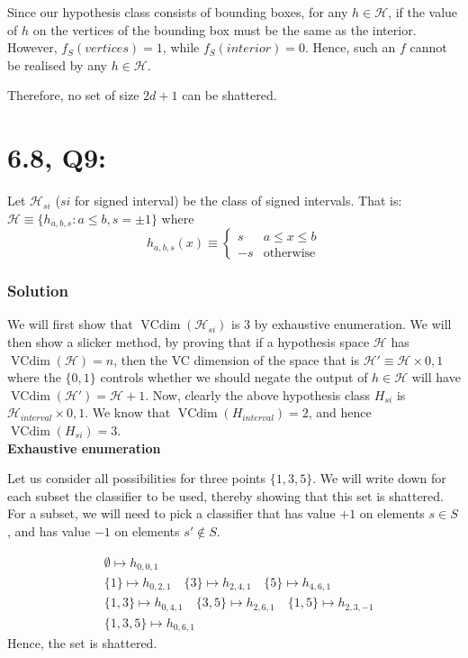 \documentclass[11pt]{article}
\renewcommand{\H}{\ensuremath{\mathcal{H}}}
\DeclareMathOperator{\vcdim}{VCdim}
\newcommand{\vc}{\ensuremath{\vcdim}}
\begin{document}
Since our hypothesis class consists of bounding boxes, for any $h\in \H$, if
the value of $h$ on the vertices of the bounding box must be the same
as the interior. However, $f_S(vertices) = 1$, while $f_S(interior) = 0$.
Hence, such an $f$ cannot be realised by any $h \in \H$. 

Therefore, no set of size $2d+1$ can be shattered.


\section*{6.8, Q9:}
Let $\H_{si}$ ($si$ for signed interval) be the class of signed intervals.
That is: $\H \equiv \{ h_{a, b, s} : a \leq b, s = \pm 1 \}$
where 
$$
h_{a, b, s}(x) \equiv
\begin{cases}
    s & a \leq x \leq b \\
    -s & \text{otherwise}
\end{cases}
$$

\subsubsection*{Solution}

We will first show that $\vc(\H_{si})$ is 3 by exhaustive enumeration. We will
then show a slicker method, by proving that if a hypothesis space $\H$
has $\vcdim(\H) = n$, then the VC dimension of the space that is $\H' \equiv \H \times {0, 1}$
where the $\{0, 1\}$ controls whether we should negate the output of $h \in \H$
will have $\vcdim(\H') = \H+1$. Now, clearly the above hypothesis class $H_{si}$
is $\H_{interval} \times{0, 1}$. We know that $\vc(H_{interval}) = 2$, and
hence $\vc(H_{si}) = 3$. \\

\textbf{Exhaustive enumeration}

Let us consider all possibilities for three points $\{ 1, 3, 5 \}$. We will 
write down for each subset the classifier to be used, thereby showing that
this set is shattered. For a subset, we will need to pick a classifier that
has value $+1$ on elements $s \in S$, and has value $-1$ on elements $s' \not \in S$.

\begin{align*}
    &\emptyset \mapsto h_{0, 0, 1} \\
    &\{ 1 \} \mapsto h_{0, 2, 1} \quad
    \{ 3 \} \mapsto h_{2, 4, 1} \quad
    \{ 5 \} \mapsto h_{4, 6, 1} \\
    &\{ 1, 3 \} \mapsto h_{0, 4, 1} \quad
    \{ 3, 5 \} \mapsto h_{2, 6, 1} \quad
    \{ 1, 5 \} \mapsto h_{2, 3, -1} \\
    &\{1, 3, 5\} \mapsto h_{0, 6, 1}
\end{align*}
Hence, the set is shattered.
\end{document}
